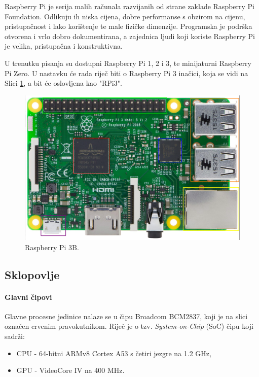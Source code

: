 \documentclass[12pt,a4paper]{article}
\begin{document}
Raspberry Pi je serija malih računala razvijanih od strane zaklade Raspberry Pi Foundation. Odlikuju ih niska cijena, dobre performanse s obzirom na cijenu, pristupačnost i lako korištenje te male fizičke dimenzije. Programska je podrška otvorena i vrlo dobro dokumentirana, a zajednica ljudi koji koriste Raspberry Pi je velika, pristupačna i konstruktivna. \\
\par
U trenutku pisanja su dostupni Raspberry Pi 1, 2 i 3, te minijaturni Raspberry Pi Zero. U nastavku će rada riječ biti o Raspberry Pi 3 inačici, koja se vidi na Slici \ref{fig:rpi3}, a bit će oslovljena kao "RPi3".
\begin{figure}[h!]
  \includegraphics[width=\linewidth]{slike/rpi3_color.png}
  \caption{Raspberry Pi 3B.}
  \label{fig:rpi3}
\end{figure}

	\subsection{Sklopovlje}
		\paragraph{Glavni čipovi} %
		\label{par:main_chips}
		
		Glavne procesne jedinice nalaze se u čipu Broadcom BCM2837, koji je na slici označen crvenim pravokutnikom. Riječ je o tzv. \textit{System-on-Chip} (SoC) čipu koji sadrži:
		\begin{itemize}
			\item CPU - 64-bitni ARMv8 Cortex A53 s četiri jezgre na 1.2 GHz,
			\item GPU - VideoCore IV na 400 MHz.
		\end{itemize}
\end{document}
